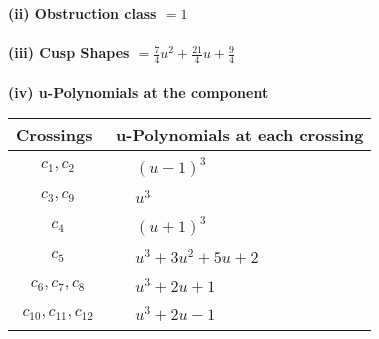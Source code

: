 \documentclass[1p]{elsarticle_modified}
\theoremstyle{definition}
\begin{document}
\flushleft \textbf{(ii) Obstruction class $= 1$}\\~\\
\flushleft \textbf{(iii) Cusp Shapes $= \frac{7}{4} u^2+\frac{21}{4} u+\frac{9}{4}$}\\~\\
\newpage\renewcommand{\arraystretch}{1}
\flushleft \textbf{(iv) u-Polynomials at the component}\newline \\
\begin{tabular}{m{50pt}|m{274pt}}
Crossings & \hspace{64pt}u-Polynomials at each crossing \\
\hline $$\begin{aligned}c_{1},c_{2}\end{aligned}$$&$\begin{aligned}
&(u-1)^3
\end{aligned}$\\
\hline $$\begin{aligned}c_{3},c_{9}\end{aligned}$$&$\begin{aligned}
&u^3
\end{aligned}$\\
\hline $$\begin{aligned}c_{4}\end{aligned}$$&$\begin{aligned}
&(u+1)^3
\end{aligned}$\\
\hline $$\begin{aligned}c_{5}\end{aligned}$$&$\begin{aligned}
&u^3+3 u^2+5 u+2
\end{aligned}$\\
\hline $$\begin{aligned}c_{6},c_{7},c_{8}\end{aligned}$$&$\begin{aligned}
&u^3+2 u+1
\end{aligned}$\\
\hline $$\begin{aligned}c_{10},c_{11},c_{12}\end{aligned}$$&$\begin{aligned}
&u^3+2 u-1
\end{aligned}$\\
\hline
\end{tabular}\\~\\
\end{document}
